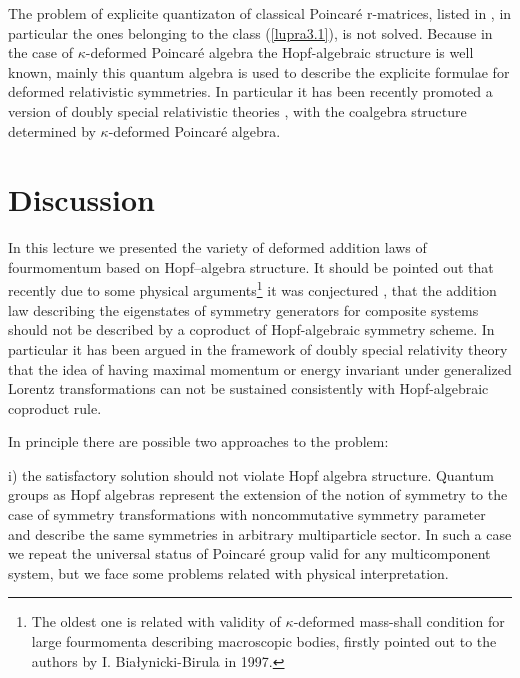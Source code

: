 \documentclass[a4paper,a4paper]{article}
\begin{document}
The problem of explicite quantizaton of classical Poincar\'{e}
r-matrices, listed in \cite{zak}, in particular the ones belonging
to the class (\ref{lupra3.1}), is not solved. Because in the case
of $\kappa$-deformed Poincar\'{e} algebra the Hopf-algebraic
structure is well known, mainly this quantum algebra is used to
describe the explicite formulae for deformed relativistic
symmetries. In particular it has been recently promoted a version
of doubly special relativistic theories \cite{bak}, \cite{jkg}
with the coalgebra structure determined by $\kappa$-deformed
Poincar\'{e} algebra.

\section{Discussion}
\setcounter{equation}{0}

 In this lecture we presented the variety of deformed addition laws
of fourmomentum based on Hopf--algebra structure. It should be
pointed out that recently due to some physical
arguments\footnote{The oldest one is related with validity of
$\kappa$-deformed mass-shall condition for large fourmomenta
describing macroscopic bodies, firstly pointed out to the authors
by I. Bia{\l}ynicki-Birula in 1997.} it was conjectured
\cite{ms2}, \cite{jkg2} that the addition law describing the
eigenstates of symmetry generators for composite systems should
not be described by a coproduct of Hopf-algebraic symmetry 
scheme.
In particular it has been argued in the framework of doubly
special relativity theory that the idea of having maximal momentum
or energy invariant under generalized Lorentz transformations can
not be sustained consistently with Hopf-algebraic coproduct rule.

In principle there are possible two approaches to the problem:

 i) the satisfactory solution should not violate Hopf algebra
structure. Quantum groups as Hopf algebras represent the 
extension
of the notion of symmetry to the case of symmetry transformations
with noncommutative symmetry parameter and describe the same
symmetries in arbitrary multiparticle sector. In such a case we
repeat the universal status of Poincar\'{e} group valid for any
multicomponent system, but we face some problems related with
physical interpretation.
\end{document}
